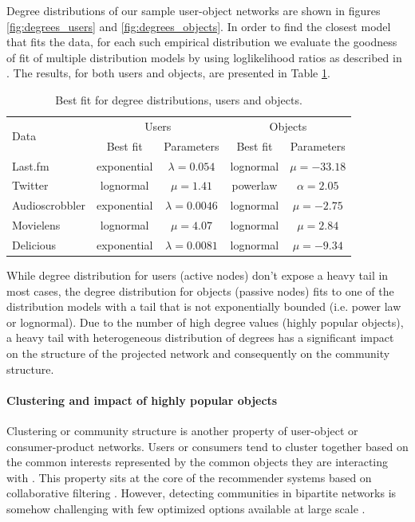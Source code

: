 Degree distributions of our sample user-object networks are shown in figures
\ref{fig:degrees_users} and \ref{fig:degrees_objects}. In order to find the
closest model that fits the data, for each such empirical distribution we
evaluate the goodness of fit of multiple distribution models by using
loglikelihood ratios as described in \citet{clauset2009power}. The results, for
both users and objects, are presented in Table \ref{tab:dist_bestfit}.

\begin{table}[!h] \centering
\begin{tabular}{ l | c c | c c }
\multirow{2}{*}{Data} & \multicolumn{2}{c}{Users} & \multicolumn{2}{c}{Objects}
\\
\cline{2-5}
& Best fit & Parameters & Best fit & Parameters \\
\hline
Last.fm & exponential & $\lambda = 0.054$ & lognormal & $\mu = -33.18$ \\
Twitter & lognormal & $\mu = 1.41$ & powerlaw & $\alpha = 2.05$ \\
Audioscrobbler & exponential & $\lambda = 0.0046$ & lognormal & $\mu = -2.75$ \\
Movielens & lognormal & $\mu = 4.07$ & lognormal & $\mu = 2.84$ \\
Delicious & exponential & $\lambda = 0.0081$ & lognormal & $\mu = -9.34$ \\
\hline
\end{tabular}
\caption{Best fit for degree distributions, users and objects.}
\label{tab:dist_bestfit}
\end{table}

While degree distribution for users (active nodes) don't expose a heavy tail in
most cases, the degree  distribution for objects (passive nodes) fits to one of
the distribution models with a tail that is not exponentially bounded (i.e.
power law or lognormal). Due to the number of high degree values (highly popular
objects), a heavy tail with heterogeneous distribution of degrees has a
significant impact on the structure of the projected network and consequently on
the community structure.

\paragraph{Clustering and impact of highly popular objects}

Clustering or community structure \citep{newman2004finding} is another property
of user-object or consumer-product networks. Users or consumers tend to cluster
together based on the common interests represented by the common objects they
are interacting with \citep{huang2007analyzing}. This property sits at the core
of the recommender systems based on collaborative filtering
\citep{breese1998empirical}. However, detecting communities in bipartite
networks is somehow challenging with few optimized options available at large
scale \citep{fortunato2010community}.

